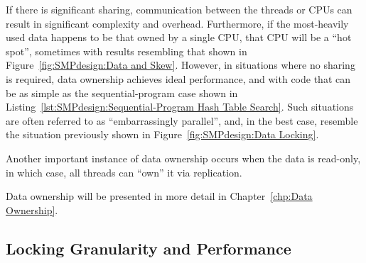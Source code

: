 If there is significant sharing, communication between the threads
or CPUs can result in significant complexity and overhead.
Furthermore, if the most-heavily used data happens to be that owned
by a single CPU, that CPU will be a ``hot spot'', sometimes with
results resembling that shown in Figure~\ref{fig:SMPdesign:Data and Skew}.
However, in situations where no sharing is required, data ownership
achieves ideal performance, and with code that can be as simple
as the sequential-program case shown in
Listing~\ref{lst:SMPdesign:Sequential-Program Hash Table Search}.
Such situations are often referred to as ``embarrassingly
parallel'', and, in the best case, resemble the situation
previously shown in Figure~\ref{fig:SMPdesign:Data Locking}.



Another important instance of data ownership occurs when the data
is read-only, in which case,
all threads can ``own'' it via replication.

Data ownership will be presented in more detail in
Chapter~\ref{chp:Data Ownership}.

\subsection{Locking Granularity and Performance}
\label{sec:SMPdesign:Locking Granularity and Performance}

